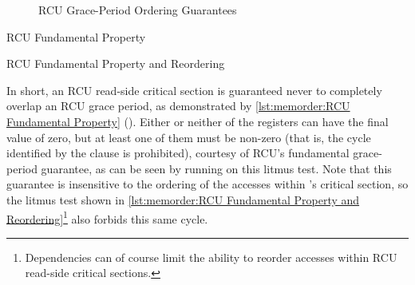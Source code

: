 \begin{figure}[tbp]
\centering
{}
\caption{RCU Grace-Period Ordering Guarantees}
\label{fig:memorder:RCU Grace-Period Ordering Guarantees}
\end{figure}

\begin{listing}[tbp]

\caption{RCU Fundamental Property}
\label{lst:memorder:RCU Fundamental Property}
\end{listing}

\begin{listing}[tbp]

\caption{RCU Fundamental Property and Reordering}
\label{lst:memorder:RCU Fundamental Property and Reordering}
\end{listing}

In short, an RCU read-side critical section is guaranteed never to
completely overlap an RCU grace period, as demonstrated by
\cref{lst:memorder:RCU Fundamental Property}
().
Either or neither of the  registers can have the final value of zero,
but at least one of them must be non-zero (that is, the cycle identified
by the  clause is prohibited), courtesy of RCU's fundamental
grace-period guarantee, as can be seen by running  on this litmus test.
Note that this guarantee is insensitive to the ordering of the accesses
within 's critical section, so the litmus test shown in
\cref{lst:memorder:RCU Fundamental Property and Reordering}\footnote{
	Dependencies can of course limit the ability to reorder accesses
	within RCU read-side critical sections.}
also forbids this same cycle.

